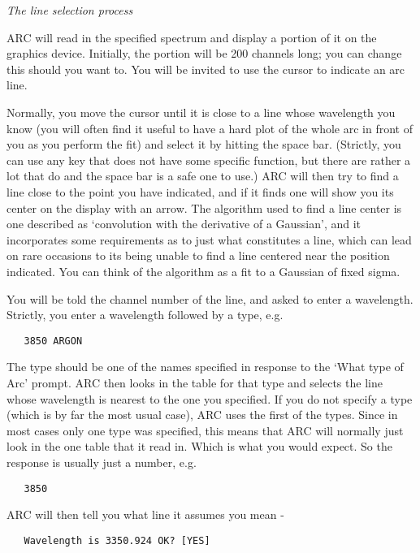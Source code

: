 \goodbreak
\vspace{12pt}
{\it The line selection process}

ARC will read in the specified spectrum and display a portion
of it on the graphics device.  Initially, the portion will be 200 channels
long; you can change this should you want to.  You will be invited to
use the cursor to indicate an arc line.

Normally, you move the cursor until it is close to a line whose
wavelength you know (you will often find it useful to have a hard plot of
the whole arc in front of you as you perform the fit) and select it by
hitting the space bar.  (Strictly, you can use any key that does not have
some specific function, but there are rather a lot that do and the
space bar is a safe one to use.)  ARC will then try to find a line close
to the point you have indicated, and if it finds one will show you its
center on the display with an arrow.  The algorithm used to find a line
center is one described as `convolution with the derivative of a
Gaussian', and it incorporates some requirements as to just what constitutes
a line, which can lead on rare occasions to its being unable to find a 
line centered near the position indicated.  You can think of the algorithm
as a fit to a Gaussian of fixed sigma.

You will be told the channel number of the line, and asked to
enter a wavelength.  Strictly, you enter a wavelength followed by a type,
e.g.

\begin{verbatim}
   3850 ARGON
\end{verbatim}

The type should be one of the names specified in response to the
`What type of Arc' prompt.  ARC then looks in the table for that type
and selects the line whose wavelength is nearest to the one you specified.
If you do not specify a type (which is by far the most usual case), ARC
uses the first of the types.  Since in most cases only one type was
specified, this means that ARC will normally just look in the one table
that it read in.  Which is what you would expect.  So the response is
usually just a number, e.g.

\begin{verbatim}
   3850
\end{verbatim}

ARC will then tell you what line it assumes you mean -

\begin{verbatim}
   Wavelength is 3350.924 OK? [YES]
\end{verbatim}

